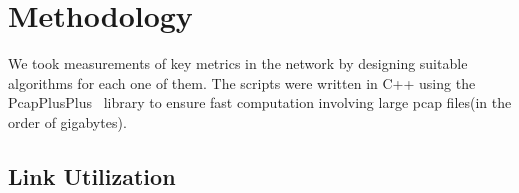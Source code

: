 
\chapter{Methodology} %

\label{Chapter3} %







We took measurements of key metrics in the network by designing suitable algorithms for each one of them. The scripts were written in C++ using the PcapPlusPlus~\cite{pcapplusplus} library to ensure fast computation involving large pcap files(in the order of gigabytes).

\section{Link Utilization}

